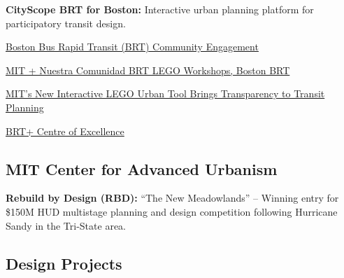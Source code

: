 \begin{tablist}
    \item[2014--2015] \tab \textbf{CityScope BRT for Boston:} {Interactive urban planning platform for participatory transit design.}
    \begin{tablist}
        \item[2016] \tab \href{https://www.media.mit.edu/projects/CityscopeBostonBRT/overview/}{Boston Bus Rapid Transit (BRT) Community Engagement}
        \item[2016] \tab \href{http://www.bostonbrt.org/mit-nuestra-comunidad-brt-lego-workshops}{MIT + Nuestra Comunidad BRT LEGO Workshops, Boston BRT}
        \item[2015] \tab \href{https://www.bloomberg.com/news/articles/2015-10-16/mit-s-new-interactive-lego-urban-tool-brings-transparency-to-transit-planning}{MIT's New Interactive LEGO Urban Tool Brings Transparency to Transit Planning}
        \item[2015] \tab \href{http://www.brt.cl/new-tools-for-a-new-era-of-open-transportation-planning/}{BRT+ Centre of Excellence}
    \end{tablist}

\end{tablist}


\subsection*{MIT Center for Advanced Urbanism}

\begin{tablist}

    \item[2013--2014] \tab \textbf{Rebuild by Design (RBD):}
    {\enquote{The New Meadowlands} -- Winning entry for \$150M HUD multistage planning and design competition following Hurricane Sandy in the Tri-State area.}

\end{tablist}


\subsection*{Design Projects}

